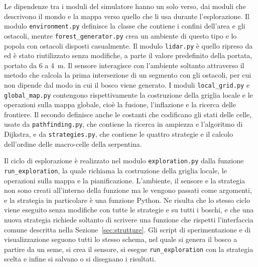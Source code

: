 Le dipendenze tra i moduli del simulatore hanno un solo verso, dai moduli che descrivono il mondo e la mappa verso quello che li usa durante l'esplorazione. Il modulo \texttt{environment.py} definisce la classe che contiene i confini dell'area e gli ostacoli, mentre \texttt{forest\_generator.py} crea un ambiente di questo tipo e lo popola con ostacoli disposti casualmente. Il modulo \texttt{lidar.py} è quello ripreso da~\cite{gennai2026} ed è stato riutilizzato senza modifiche, a parte il valore predefinito della portata, portato da 6 a 4~m. Il sensore interagisce con l'ambiente soltanto attraverso il metodo che calcola la prima intersezione di un segmento con gli ostacoli, per cui non dipende dal modo in cui il bosco viene generato. I moduli \texttt{local\_grid.py} e \texttt{global\_map.py} contengono rispettivamente la costruzione della griglia locale e le operazioni sulla mappa globale, cioè la fusione, l'inflazione e la ricerca delle frontiere. Il secondo definisce anche le costanti che codificano gli stati delle celle, usate da \texttt{pathfinding.py}, che contiene la ricerca in ampiezza e l'algoritmo di Dijkstra, e da \texttt{strategies.py}, che contiene le quattro strategie e il calcolo dell'ordine delle macro-celle della serpentina.

Il ciclo di esplorazione è realizzato nel modulo \texttt{exploration.py} dalla funzione \texttt{run\_exploration}, la quale richiama la costruzione della griglia locale, le operazioni sulla mappa e la pianificazione. L'ambiente, il sensore e la strategia non sono creati all'interno della funzione ma le vengono passati come argomenti, e la strategia in particolare è una funzione Python. Ne risulta che lo stesso ciclo viene eseguito senza modifiche con tutte le strategie e su tutti i boschi, e che una nuova strategia richiede soltanto di scrivere una funzione che rispetti l'interfaccia comune descritta nella Sezione~\ref{sec:strutture}. Gli script di sperimentazione e di visualizzazione seguono tutti lo stesso schema, nel quale si genera il bosco a partire da un seme, si crea il sensore, si esegue \texttt{run\_exploration} con la strategia scelta e infine si salvano o si disegnano i risultati.


